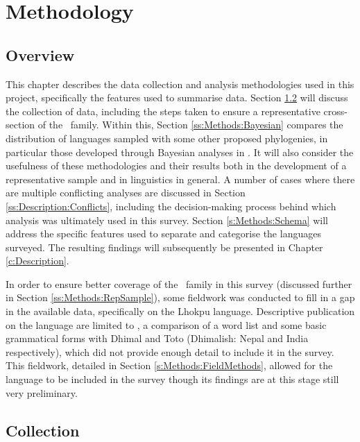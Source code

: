 \chapter{Methodology}\label{c:Methods}
\section{Overview}
This chapter describes the data collection and analysis methodologies used in this project, specifically the features used to summarise data. Section \ref{s:Methods:Collection} will discuss the collection of data, including the steps taken to ensure a representative cross-section of the \lfam\ family. Within this, Section \ref{ss:Methods:Bayesian} compares the distribution of languages sampled with some other proposed phylogenies, in particular those developed through Bayesian analyses in . It will also consider the usefulness of these methodologies and their results both in the development of a representative sample and in linguistics in general. A number of cases where there are multiple conflicting analyses are discussed in Section \ref{ss:Description:Conflicts}, including the decision-making process behind which analysis was ultimately used in this survey. Section \ref{s:Methods:Schema} will address the specific features used to separate and categorise the languages surveyed. The resulting findings will subsequently be presented in Chapter \ref{c:Description}.

In order to ensure better coverage of the \lfam\ family in this survey (discussed further in Section \ref{ss:Methods:RepSample}), some fieldwork was conducted to fill in a gap in the available data, specifically on the Lhokpu language. Descriptive publication on the language are limited to , a comparison of a word list and some basic grammatical forms with Dhimal and Toto (Dhimalish: Nepal and India respectively), which did not provide enough detail to include it in the survey. This fieldwork, detailed in Section \ref{s:Methods:FieldMethods}, allowed for the language to be included in the survey though its findings are at this stage still very preliminary.  

\section{Collection}\label{s:Methods:Collection}

